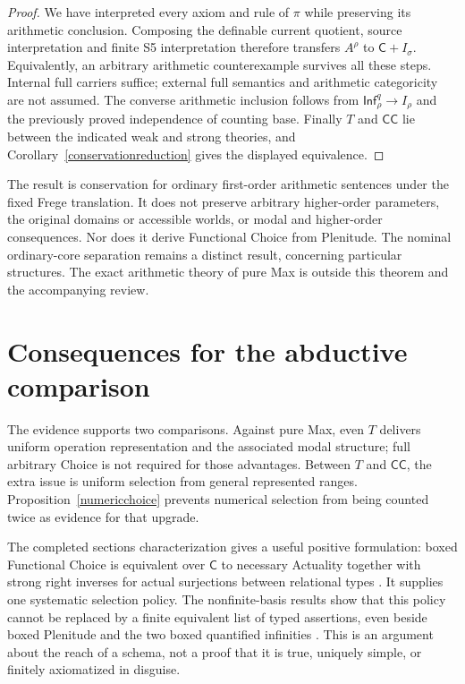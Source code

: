 \documentclass[11pt]{article}
\newcommand{\C}{\mathsf C}
\newcommand{\CC}{\mathsf{CC}}
\newcommand{\Infq}{\mathsf{Inf}^{q}}
\begin{document}
\begin{proof}
We have interpreted every axiom and rule of $\pi$ while preserving its arithmetic conclusion. Composing the definable current quotient, source interpretation and finite S5 interpretation therefore transfers $A^\rho$ to $\C+I_\sigma$. Equivalently, an arbitrary arithmetic counterexample survives all these steps. Internal full carriers suffice; external full semantics and arithmetic categoricity are not assumed. The converse arithmetic inclusion follows from $\Infq_\rho\to I_\rho$ and the previously proved independence of counting base. Finally $T$ and $\CC$ lie between the indicated weak and strong theories, and Corollary~\ref{conservationreduction} gives the displayed equivalence.
\end{proof}

The result is conservation for ordinary first-order arithmetic sentences under the fixed Frege translation. It does not preserve arbitrary higher-order parameters, the original domains or accessible worlds, or modal and higher-order consequences. Nor does it derive Functional Choice from Plenitude. The nominal ordinary-core separation \cite[\S17]{gallin} remains a distinct result, concerning particular structures. The exact arithmetic theory of pure Max is outside this theorem and the accompanying review.

\section{Consequences for the abductive comparison}

The evidence supports two comparisons. Against pure Max, even $T$ delivers uniform operation representation and the associated modal structure; full arbitrary Choice is not required for those advantages. Between $T$ and $\CC$, the extra issue is uniform selection from general represented ranges. Proposition~\ref{numericchoice} prevents numerical selection from being counted twice as evidence for that upgrade.

The completed sections characterization gives a useful positive formulation: boxed Functional Choice is equivalent over $\C$ to necessary Actuality together with strong right inverses for actual surjections between relational types \cite[\S\S1--4]{sections}. It supplies one systematic selection policy. The nonfinite-basis results show that this policy cannot be replaced by a finite equivalent list of typed assertions, even beside boxed Plenitude and the two boxed quantified infinities \cite[\S\S7--8]{finitechoice}. This is an argument about the reach of a schema, not a proof that it is true, uniquely simple, or finitely axiomatized in disguise.
\end{document}
